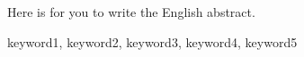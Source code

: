 
\eabstract
{
Here is for you to write the English abstract.



}
{keyword1, keyword2, keyword3, keyword4, keyword5}	%